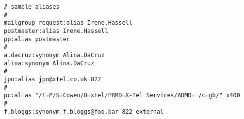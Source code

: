 \small\begin{verbatim}
# sample aliases
#
mailgroup-request:alias Irene.Hassell
postmaster:alias Irene.Hassell
pp:alias postmaster
#
a.dacruz:synonym Alina.DaCruz
alina:synonym Alina.DaCruz
#
jpo:alias jpo@xtel.co.uk 822
#
pc:alias "/I=P/S=Cowen/O=xtel/PRMD=X-Tel Services/ADMD= /c=gb/" x400
#
f.bloggs:synonym f.bloggs@foo.bar 822 external
\end{verbatim}
